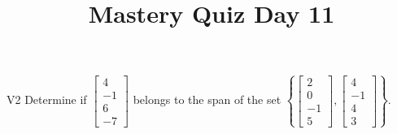 \documentclass{sbgLAquiz}
\title{Mastery Quiz Day 11 }
\begin{document}
\begin{problem}{V2}
  Determine if
  \(\begin{bmatrix} 4 \\ -1 \\ 6 \\ -7 \end{bmatrix}\)
  belongs to the span of the set
  \(\left\{
    \begin{bmatrix} 2 \\ 0 \\ -1 \\ 5 \end{bmatrix},
    \begin{bmatrix} 4 \\ -1 \\ 4 \\ 3 \end{bmatrix}
    \right\}
  \).
\end{problem}
\end{document}
